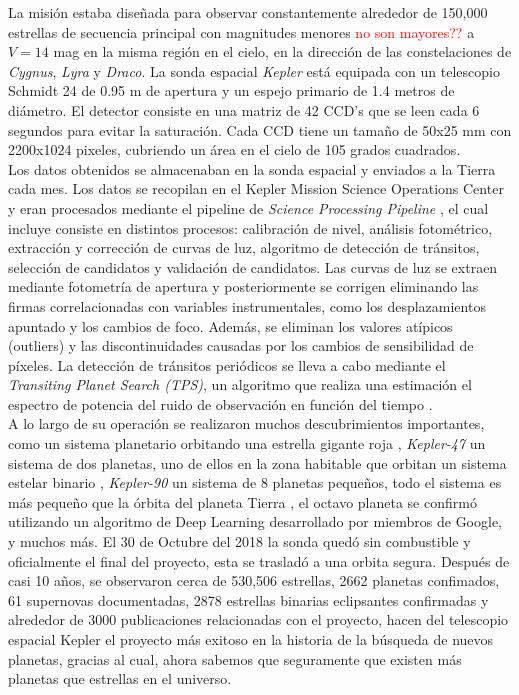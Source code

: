 La misión estaba diseñada para observar constantemente alrededor de 150,000 estrellas de secuencia principal con magnitudes menores \textcolor{red}{no son mayores??} a $V=14$ mag en la misma región en el cielo, en la dirección de las constelaciones de \textit{Cygnus}, \textit{Lyra} y \textit{Draco}. La sonda espacial \textit{Kepler} está equipada con un telescopio Schmidt 24 de 0.95 m de apertura y un espejo primario de 1.4 metros de diámetro. El detector consiste en una matriz de 42 CCD’s que se leen cada 6 segundos para evitar la saturación. Cada CCD tiene un tamaño de 50x25 mm con 2200x1024 pixeles, cubriendo un área en el cielo de 105 grados cuadrados.\\

Los datos obtenidos se almacenaban en la sonda espacial y enviados a la Tierra cada mes. Los datos se recopilan en el Kepler Mission Science Operations Center y eran procesados mediante el pipeline de \textit{Science Processing Pipeline} \cite{jenkins2010overview}, el cual incluye consiste en distintos procesos: calibración de nivel, análisis fotométrico, extracción y corrección de curvas de luz, algoritmo de detección de tránsitos, selección de candidatos y validación de candidatos. Las curvas de luz se extraen mediante fotometría de apertura y posteriormente se corrigen eliminando las firmas correlacionadas con variables instrumentales, como los desplazamientos apuntado y los cambios de foco.
Además, se eliminan los valores atípicos (outliers) y las discontinuidades causadas por los cambios de sensibilidad de píxeles. La detección de tránsitos periódicos se lleva a cabo mediante el \textit{Transiting Planet Search (TPS)}, un algoritmo que realiza una estimación el espectro de potencia del ruido de observación en función del tiempo \cite{jenkins2010transiting}.\\

A lo largo de su operación se realizaron muchos descubrimientos importantes, como un sistema planetario orbitando una estrella gigante roja \cite{charpinet2011compact}, \textit{Kepler-47} un sistema de dos planetas, uno de ellos en la zona habitable que orbitan un sistema estelar binario \cite{orosz2012kepler}, \textit{Kepler-90} un sistema de 8 planetas pequeños, todo el sistema es más pequeño que la órbita del planeta Tierra \cite{shallue2018identifying}, el octavo planeta se confirmó utilizando un algoritmo de Deep Learning desarrollado por miembros de Google, y muchos más. El 30 de Octubre del 2018 la sonda quedó sin combustible y oficialmente el final del proyecto, esta se trasladó a una orbita segura. Después de casi 10 años, se observaron cerca de 530,506 estrellas, 2662 planetas confimados, 61 supernovas documentadas, 2878 estrellas binarias eclipsantes confirmadas y alrededor de 3000 publicaciones relacionadas con el proyecto, hacen del telescopio espacial Kepler el proyecto más exitoso en la historia de la búsqueda de nuevos planetas, gracias al cual, ahora sabemos que seguramente que existen más planetas que estrellas en el universo.\\

